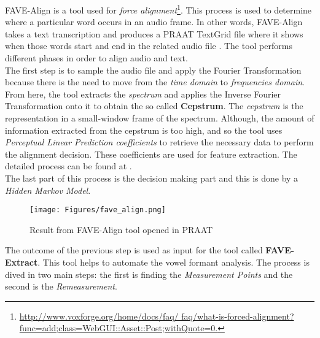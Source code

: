 \noindent FAVE-Align is a tool used for \textit{force alignment}\footnote{\url{http://www.voxforge.org/home/docs/faq/ faq/what-is-forced-alignment?func=add;class=WebGUI::Asset::Post;withQuote=0.}}. This process is used to determine where a particular word occurs in an audio frame. In other words, FAVE-Align takes a text transcription and produces a PRAAT TextGrid file where it shows when those words start and end in the related audio file \cite{weik2012communications}. The tool performs different phases in order to align audio and text.\\

\noindent The first step is to sample the audio file and apply the Fourier Transformation because there is the need to move from the \textit{time domain} to \textit{frequencies domain}. From here, the tool extracts the \textit{spectrum} and applies the Inverse Fourier Transformation onto it to obtain the so called \textbf{Cepstrum}. The \textit{cepstrum} is the representation in a small-window frame of the spectrum. Although, the amount of information extracted from the cepstrum is too high, and so the tool uses \textit{Perceptual Linear Prediction coefficients} to retrieve the necessary data to perform the alignment decision. These coefficients are used for feature extraction. The detailed process can be found at \cite{hermansky1990perceptual}. \\
The last part of this process is the decision making part and this is done by a \textit{Hidden Markov Model}. \\

\begin{figure}[!ht]
	\centering
	\texttt{[image: Figures/fave\_align.png]}
	\caption{Result from FAVE-Align tool opened in PRAAT}
	\label{fig:fave-align_result}
\end{figure}

\noindent The outcome of the previous step is used as input for the tool called \textbf{FAVE-Extract}. This tool helps to automate the vowel formant analysis. The process is dived in two main steps: the first is finding the \textit{Measurement Points} and the second is the \textit{Remeasurement}. \\

